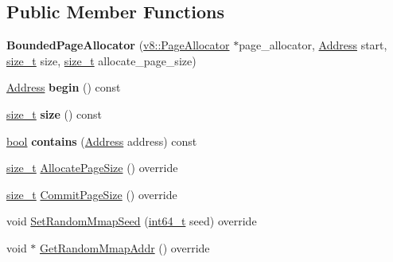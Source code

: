 \subsection*{Public Member Functions}
\begin{DoxyCompactItemize}
\item 
\mbox{\label{classv8_1_1base_1_1BoundedPageAllocator_aa6d298a5738d655554536267aedba6bc}} 
{\bfseries Bounded\+Page\+Allocator} (\mbox{\hyperlink{classv8_1_1PageAllocator}{v8\+::\+Page\+Allocator}} $\ast$page\+\_\+allocator, \mbox{\hyperlink{classuintptr__t}{Address}} start, \mbox{\hyperlink{classsize__t}{size\+\_\+t}} size, \mbox{\hyperlink{classsize__t}{size\+\_\+t}} allocate\+\_\+page\+\_\+size)
\item 
\mbox{\label{classv8_1_1base_1_1BoundedPageAllocator_aa8e5cc481084f4dfa3ee3dc68084f8e5}} 
\mbox{\hyperlink{classuintptr__t}{Address}} {\bfseries begin} () const
\item 
\mbox{\label{classv8_1_1base_1_1BoundedPageAllocator_a459d26a32a75ec7e9585463866ccbb38}} 
\mbox{\hyperlink{classsize__t}{size\+\_\+t}} {\bfseries size} () const
\item 
\mbox{\label{classv8_1_1base_1_1BoundedPageAllocator_a76e61198e5317b3a67b18de065ce1f14}} 
\mbox{\hyperlink{classbool}{bool}} {\bfseries contains} (\mbox{\hyperlink{classuintptr__t}{Address}} address) const
\item 
\mbox{\hyperlink{classsize__t}{size\+\_\+t}} \mbox{\hyperlink{classv8_1_1base_1_1BoundedPageAllocator_af7b999d6c3a3526636230bf6b7d72784}{Allocate\+Page\+Size}} () override
\item 
\mbox{\hyperlink{classsize__t}{size\+\_\+t}} \mbox{\hyperlink{classv8_1_1base_1_1BoundedPageAllocator_a68462e5a1751aa3a8fb0068deca16c5f}{Commit\+Page\+Size}} () override
\item 
void \mbox{\hyperlink{classv8_1_1base_1_1BoundedPageAllocator_a53d343cc7d2acb2f059e6dd4ea29bc0f}{Set\+Random\+Mmap\+Seed}} (\mbox{\hyperlink{classint64__t}{int64\+\_\+t}} seed) override
\item 
void $\ast$ \mbox{\hyperlink{classv8_1_1base_1_1BoundedPageAllocator_aafb1cb9ac6fed20bdba0806a46f28bfc}{Get\+Random\+Mmap\+Addr}} () override
\item 

\end{DoxyCompactItemize}
